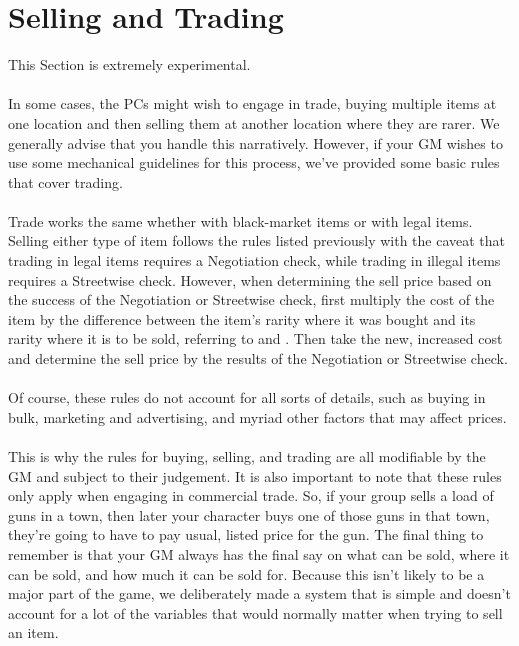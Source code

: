 \section{Selling and Trading}\label{chap:sec:trading}

This Section is extremely experimental.\\
\\
In some cases, the PCs might wish to engage in trade, buying multiple items at one
location and then selling them at another location where they are rarer. We generally
advise that you handle this narratively. However, if your GM wishes to use some
mechanical guidelines for this process, we’ve provided some basic rules that cover trading.\\
\\
Trade works the same whether with black-market items or with legal items. Selling
either type of item follows the rules listed previously with the caveat that trading
in legal items requires a Negotiation check, while trading in illegal items requires a
Streetwise check. However, when determining the sell price based on the success of the
Negotiation or Streetwise check, first multiply the cost of the item by the difference
between the item's rarity where it was bought and its rarity where it is to be sold,
referring to  and .
Then take the new, increased cost and determine the sell price by the results of the
Negotiation or Streetwise check.\\
\\
Of course, these rules do not account for all sorts of details, such as buying in bulk,
marketing and advertising, and myriad other factors that may affect prices.\\
\\
This is why the rules for buying, selling, and trading are all modifiable by the GM and
subject to their judgement. It is also important to note that these rules only apply when
engaging in commercial trade. So, if your group sells a load of guns in a town, then
later your character buys one of those guns in that town, they’re going to have to pay
usual, listed price for the gun. The final thing to remember is that your GM always has the
final say on what can be sold, where it can be sold, and how much it can be sold for.
Because this isn't likely to be a major part of the game, we deliberately made a system
that is simple and doesn't account for a lot of the variables that would normally matter
when trying to sell an item.

